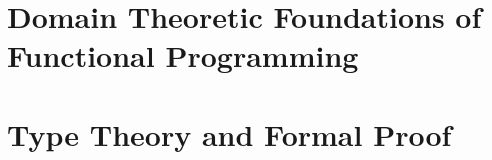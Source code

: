 \documentclass[11pt, oneside, openany]{book}
\begin{document}
\part{Domain Theoretic Foundations of Functional Programming}

 

 
 
 
 

\part{Type Theory and Formal Proof}

% 
% 
% 
% 
% 
% 
\end{document}
